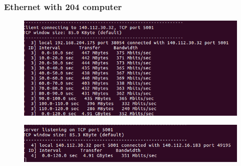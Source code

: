 \documentclass{article}
\begin{document}
        \subsubsection{Ethernet with 204 computer}
            \begin{figure}[!htb]
                \begin{flushleft}
                \includegraphics[scale=0.4]{eth0.png}
                \end{flushleft}
            \end{figure}
            \begin{figure}[!htb]
                \begin{flushleft}
                \includegraphics[scale=0.4]{eth1.png}
                \end{flushleft}
            \end{figure}
\end{document}
